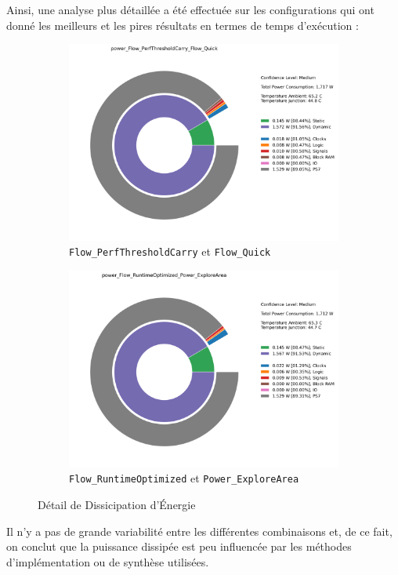 \documentclass[../CSC_5RO07_TA.tex]{subfiles}
\begin{document}
\noindent Ainsi, une analyse plus détaillée a été effectuée sur les configurations qui ont donné les meilleurs et les pires résultats en termes de temps d'exécution :
\begin{figure}[H]
    \centering
    \begin{subfigure}[b]{0.475\textwidth}
        \centering
        \includegraphics[width=\linewidth]{images/2_power_Flow_PerfThresholdCarry_Flow_Quick.png}
        \caption{\texttt{Flow\_PerfThresholdCarry} et \texttt{Flow\_Quick}}
    \end{subfigure}\hfill
    \begin{subfigure}[b]{0.475\textwidth}
        \centering
        \includegraphics[width=\linewidth]{images/2_power_Flow_RuntimeOptimized_Power_ExploreArea.png}
        \caption{\texttt{Flow\_RuntimeOptimized} et \texttt{Power\_ExploreArea}}
    \end{subfigure}
    \caption{Détail de Dissicipation d'Énergie}
    \label{fig:power_detail_2}
\end{figure}
\noindent Il n'y a pas de grande variabilité entre les différentes combinaisons et, de ce fait, on conclut que la puissance dissipée est peu influencée par les méthodes d'implémentation ou de synthèse utilisées.
\end{document}
